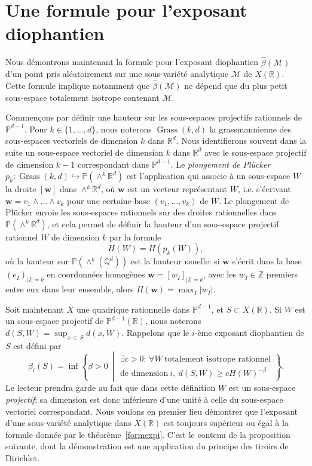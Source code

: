 \documentclass[AHL,Unicode,longabstracts,francais,published]{cedram}
\DeclareMathOperator{\Grass}{Grass}
\newcommand{\abs}[1]{\lvert#1\rvert}
\newcommand{\se}[2]{\{#1,\dots,#2\}}
\newcommand{\R}{\mathbb{R}}
\newcommand{\Z}{\mathbb{Z}}
\newcommand{\Q}{\mathbb{Q}}
\newcommand{\PP}{\mathbb{P}}
\newcommand{\bw}{\mathbf{w}}
\newcommand{\cM}{\mathcal{M}}
\newcommand{\bbeta}{\widehat{\beta}}
\let\oldexists\exists
\renewcommand*{\exists}{\mathrel{\oldexists}}
\let\oldforall\forall
\renewcommand*{\forall}{\mathrel{\oldforall}}
\begin{document}
\section{Une formule pour l'exposant diophantien}\label{sec:formule_exposant}

Nous démontrons maintenant la formule pour l'exposant diophantien $\bbeta(\cM)$ d'un point pris aléatoirement sur une sous-variété analytique $\cM$ de $X(\R)$. Cette formule implique notamment que $\bbeta(\cM)$ ne dépend que du plus petit sous-espace totalement isotrope contenant $\cM$.


Commençons par définir une hauteur sur les sous-espaces projectifs rationnels de $\PP^{d-1}$. Pour $k\in\se{1}{d}$, nous noterons $\Grass(k,d)$ la grassmannienne des sous-espaces vectoriels de dimension $k$ dans $\R^d$. Nous identifierons souvent dans la suite un sous-espace vectoriel de dimension $k$ dans $\R^d$ avec le sous-espace projectif de dimension $k-1$ correspondant dans $\PP^{d-1}$. Le \emph{plongement de Pl\"ucker} $p_k:\Grass(k,d)\hookrightarrow\PP(\wedge^k\R^d)$ est l'application qui associe à un sous-espace $W$ la droite $[\bw]$ dans $\wedge^k\R^d$, où $\bw$ est un vecteur représentant $W$, i.e. s'écrivant $\bw=v_1\wedge\dots\wedge v_k$ pour une certaine base $(v_1,\dots,v_k)$ de $W$. Le plongement de Pl\"ucker envoie les sous-espaces rationnels sur des droites rationnelles dans $\PP(\wedge^k\R^d)$, et cela permet de définir la hauteur d'un sous-espace projectif rationnel $W$ de dimension $k$ par la formule
\[
H(W) = H\left(p_k(W)\right),
\]
où la hauteur sur $\PP(\wedge^k(\Q^d))$ est la hauteur usuelle: si $\bw$ s'écrit dans la base $(e_I)_{\abs{I}=k}$ en coordonnées homogènes $\bw=[w_I]_{\abs{I}=k}$, avec les $w_I\in\Z$ premiers entre eux dans leur ensemble, alors $H(\bw)=\max_I\abs{w_I}$.

Soit maintenant $X$ une quadrique rationnelle dans $\PP^{d-1}$, et $S\subset X(\R)$. Si $W$ est un sous-espace projectif de $\PP^{d-1}(\R)$, nous noterons $d(S,W)=\sup_{x\,\in\,S} d(x,W)$. Rappelons que le $i$-ème exposant diophantien de $S$ est défini par
\[
\beta_i(S) = \inf\left\{\beta>0\ \middle|
\begin{split}
\exists c>0:\,\forall W\ \text{totalement isotrope rationnel}\\
\text{de dimension}\ i,\ d(S,W)\geq cH(W)^{-\beta}
\end{split}
\right\}.
\]
Le lecteur prendra garde au fait que dans cette définition $W$ est un sous-espace \emph{projectif}; sa dimension est donc inférieure d'une unité à celle du sous-espace vectoriel correspondant. Nous voulons en premier lieu démontrer que l'exposant d'une sous-variété analytique dans $X(\R)$ est toujours supérieur ou égal à la formule donnée par le théorème~\ref{formexpi}. C'est le contenu de la proposition suivante, dont la démonstration est une application du principe des tiroirs de Dirichlet.
\end{document}
